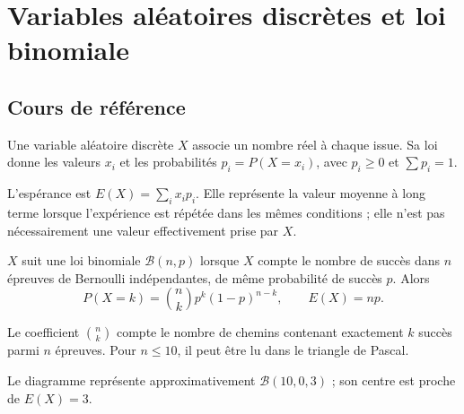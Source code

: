 
\chapter{Variables aléatoires discrètes et loi binomiale}
\section{Cours de référence}
Une variable aléatoire discrète $X$ associe un nombre réel à chaque issue. Sa loi donne les valeurs $x_i$ et les probabilités $p_i=P(X=x_i)$, avec $p_i\geq0$ et $\sum p_i=1$.

\begin{retenir}
L'espérance est $E(X)=\sum_i x_ip_i$. Elle représente la valeur moyenne à long terme lorsque l'expérience est répétée dans les mêmes conditions ; elle n'est pas nécessairement une valeur effectivement prise par $X$.
\end{retenir}

\begin{center}
\end{center}

\begin{retenir}
$X$ suit une loi binomiale $\mathcal B(n,p)$ lorsque $X$ compte le nombre de succès dans $n$ épreuves de Bernoulli indépendantes, de même probabilité de succès $p$. Alors
\[
P(X=k)=\binom nk p^k(1-p)^{n-k},\qquad E(X)=np.
\]
\end{retenir}

Le coefficient $\binom nk$ compte le nombre de chemins contenant exactement $k$ succès parmi $n$ épreuves. Pour $n\leq10$, il peut être lu dans le triangle de Pascal.

\begin{center}
\end{center}
Le diagramme représente approximativement $\mathcal B(10,0{,}3)$ ; son centre est proche de $E(X)=3$.

